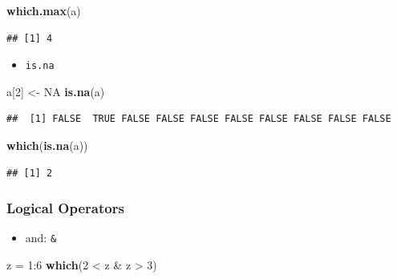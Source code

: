 \documentclass[]{article}
\def\tightlist{}
\newenvironment{Shaded}{\begin{snugshade}}{\end{snugshade}}
\newcommand{\KeywordTok}[1]{\textcolor[rgb]{0.13,0.29,0.53}{\textbf{{#1}}}}
\newcommand{\DecValTok}[1]{\textcolor[rgb]{0.00,0.00,0.81}{{#1}}}
\newcommand{\StringTok}[1]{\textcolor[rgb]{0.31,0.60,0.02}{{#1}}}
\newcommand{\OtherTok}[1]{\textcolor[rgb]{0.56,0.35,0.01}{{#1}}}
\newcommand{\NormalTok}[1]{{#1}}
\numberwithin{equation}{section}
\begin{document}
\begin{Shaded}
\begin{Highlighting}[]
\KeywordTok{which.max}\NormalTok{(a)}
\end{Highlighting}
\end{Shaded}

\begin{verbatim}
## [1] 4
\end{verbatim}

\begin{itemize}
\tightlist
\item
  \texttt{is.na}
\end{itemize}

\begin{Shaded}
\begin{Highlighting}[]
 \NormalTok{a[}\DecValTok{2}\NormalTok{] <-}\StringTok{ }\OtherTok{NA}
\KeywordTok{is.na}\NormalTok{(a)}
\end{Highlighting}
\end{Shaded}

\begin{verbatim}
##  [1] FALSE  TRUE FALSE FALSE FALSE FALSE FALSE FALSE FALSE FALSE
\end{verbatim}

\begin{Shaded}
\begin{Highlighting}[]
\KeywordTok{which}\NormalTok{(}\KeywordTok{is.na}\NormalTok{(a))}
\end{Highlighting}
\end{Shaded}

\begin{verbatim}
## [1] 2
\end{verbatim}

\subsubsection{Logical Operators}\label{logical-operators}

\begin{itemize}
\tightlist
\item
  and: \texttt{\&}
\end{itemize}

\begin{Shaded}
\begin{Highlighting}[]
\NormalTok{z =}\StringTok{ }\DecValTok{1}\NormalTok{:}\DecValTok{6}
\KeywordTok{which}\NormalTok{(}\DecValTok{2} \NormalTok{<}\StringTok{ }\NormalTok{z &}\StringTok{ }\NormalTok{z >}\StringTok{ }\DecValTok{3}\NormalTok{)}
\end{Highlighting}
\end{Shaded}
\end{document}

